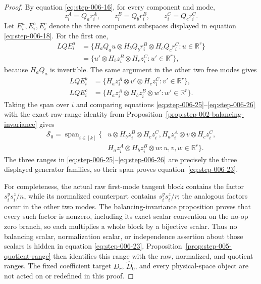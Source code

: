 \begin{proof}
By equation \eqref{eq:step-006-16}, for every component and mode,
\begin{equation}
  z_i^A=Q_ar_i^A,\qquad z_i^B=Q_br_i^B,
  \qquad z_i^C=Q_cr_i^C.                                     \label{eq:step-006-24}
\end{equation}
Let \(E_i^a,E_i^b,E_i^c\) denote the three component subspaces displayed in
equation \eqref{eq:step-006-18}. For the first one,
\begin{equation}
\begin{aligned}
  LQ E_i^a
  &=\{H_aQ_au\otimes H_bQ_br_i^B\otimes H_cQ_cr_i^C:
      u\in\mathbb R^r\}\\
  &=\{u'\otimes H_bz_i^B\otimes H_cz_i^C:
      u'\in\mathbb R^r\},
\end{aligned}\label{eq:step-006-25}
\end{equation}
because \(H_aQ_a\) is invertible. The same argument in the other two free
modes gives
\begin{equation}
\begin{aligned}
  LQ E_i^b
    &=\{H_az_i^A\otimes v'\otimes H_cz_i^C:v'\in\mathbb R^r\},\\
  LQ E_i^c
    &=\{H_az_i^A\otimes H_bz_i^B\otimes w':w'\in\mathbb R^r\}.
\end{aligned}\label{eq:step-006-26}
\end{equation}
Taking the span over \(i\) and comparing equations \eqref{eq:step-006-25}--\eqref{eq:step-006-26} with the
exact raw-range identity from
Proposition~\ref{prop:step-002-balancing-invariance} gives
\begin{equation}
\begin{aligned}
  \mathscr S_0=\operatorname{span}_{i\in[k]}\{&
    u\otimes H_bz_i^B\otimes H_cz_i^C,
    H_az_i^A\otimes v\otimes H_cz_i^C,\\
   &H_az_i^A\otimes H_bz_i^B\otimes w:
    u,v,w\in\mathbb R^r\}.
\end{aligned}\label{eq:step-006-raw-range}
\end{equation}
The three ranges in \eqref{eq:step-006-25}--\eqref{eq:step-006-26}
are precisely the three displayed generator families, so their span proves
equation~\eqref{eq:step-006-23}.

For completeness, the actual raw first-mode tangent block contains the
factor \(s_i^ys_i^z/n\), while its normalized counterpart contains
\(s_i^ys_i^z/r\); the analogous factors occur in the other two modes. The
balancing-invariance proposition proves that every such factor is
nonzero, including its exact scalar convention on the no-op zero branch, so
each multiplies a whole block by a bijective scalar. Thus no balancing scalar,
normalization scalar, or independence assertion about those scalars is hidden
in equation \eqref{eq:step-006-23}. Proposition~\ref{prop:step-005-quotient-range} then
identifies this range with the raw, normalized, and quotient ranges. The fixed coefficient
target \(D_r\), \(\widehat D_0\), and every physical-space object are not acted
on or redefined in this proof. 

\end{proof}

